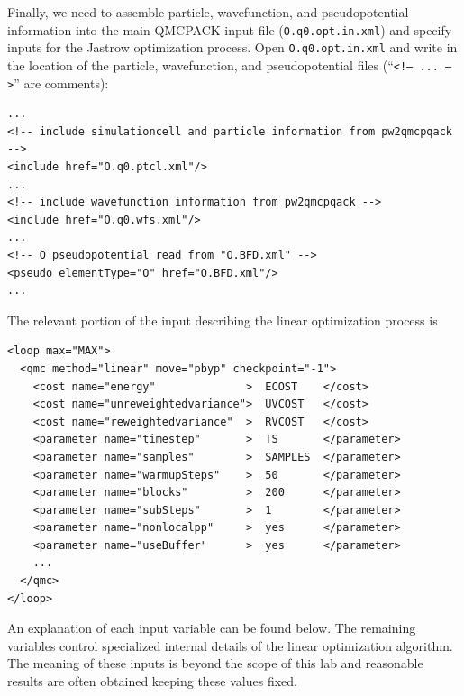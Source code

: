 Finally, we need to assemble particle, wavefunction, and pseudopotential information into the main QMCPACK input file (\texttt{O.q0.opt.in.xml}) and specify inputs for the Jastrow optimization process.  Open \texttt{O.q0.opt.in.xml} and write in the location of the particle, wavefunction, and pseudopotential files (``\texttt{<!-- ... -->}'' are comments):
\begin{lstlisting}
...
<!-- include simulationcell and particle information from pw2qmcpqack -->
<include href="O.q0.ptcl.xml"/>
...
<!-- include wavefunction information from pw2qmcpqack -->
<include href="O.q0.wfs.xml"/>
...
<!-- O pseudopotential read from "O.BFD.xml" -->
<pseudo elementType="O" href="O.BFD.xml"/>
...
\end{lstlisting}
\noindent
The relevant portion of the input describing the linear optimization process is
\begin{lstlisting}
<loop max="MAX">  
  <qmc method="linear" move="pbyp" checkpoint="-1">
    <cost name="energy"              >  ECOST    </cost>
    <cost name="unreweightedvariance">  UVCOST   </cost>
    <cost name="reweightedvariance"  >  RVCOST   </cost>
    <parameter name="timestep"       >  TS       </parameter>
    <parameter name="samples"        >  SAMPLES  </parameter>
    <parameter name="warmupSteps"    >  50       </parameter>
    <parameter name="blocks"         >  200      </parameter>
    <parameter name="subSteps"       >  1        </parameter>
    <parameter name="nonlocalpp"     >  yes      </parameter>
    <parameter name="useBuffer"      >  yes      </parameter>
    ...
  </qmc>
</loop>
\end{lstlisting}
\noindent
An explanation of each input variable can be found below.  The remaining variables control specialized internal details of the linear optimization algorithm.  The meaning of these inputs is beyond the scope of this lab and reasonable results are often obtained keeping these values fixed. 
